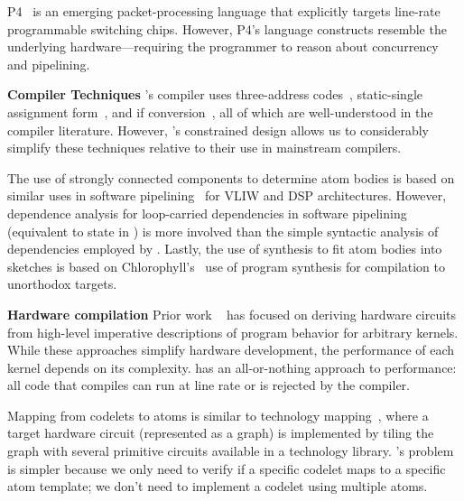 P4~\cite{p4} is an emerging packet-processing language that explicitly targets
line-rate programmable switching chips. However, P4's language constructs
resemble the underlying hardware---requiring the programmer to reason about
concurrency and pipelining.

\textbf{Compiler Techniques}
\pktlanguage's compiler uses three-address codes~\cite{tac}, static-single
assignment form~\cite{ssa}, and if conversion~\cite{if_conversion}, all of
which are well-understood in the compiler literature. However, \pktlanguage's
constrained design allows us to considerably simplify these techniques relative
to their use in mainstream compilers.

The use of strongly connected components to determine atom bodies is based on
similar uses in software pipelining~\cite{software_pipelining} for VLIW and DSP
architectures. However, dependence analysis for loop-carried dependencies in
software pipelining (equivalent to state in \pktlanguage) is more involved than
the simple syntactic analysis of dependencies employed by \pktlanguage. Lastly,
the use of synthesis to fit atom bodies into sketches is based on
Chlorophyll's~\cite{chlorophyll} use of program synthesis for compilation to
unorthodox targets.

\textbf{Hardware compilation}
Prior work ~\cite{nurvadathi, cash, bluespec} has focused on deriving hardware
circuits from high-level imperative descriptions of program behavior for
arbitrary kernels. While these approaches simplify hardware development, the
performance of each kernel depends on its complexity.  \pktlanguage has an
all-or-nothing approach to performance: all code that compiles can run at
line rate or is rejected by the compiler.

Mapping from codelets to atoms is similar to technology mapping~\cite{micheli,
flowmap, spectransform}, where a target hardware circuit (represented as a
graph) is implemented by tiling the graph with several primitive circuits
available in a technology library. \pktlanguage's problem is simpler because we
only need to verify if a specific codelet maps to a specific atom template; we
don't need to implement a codelet using multiple atoms.
